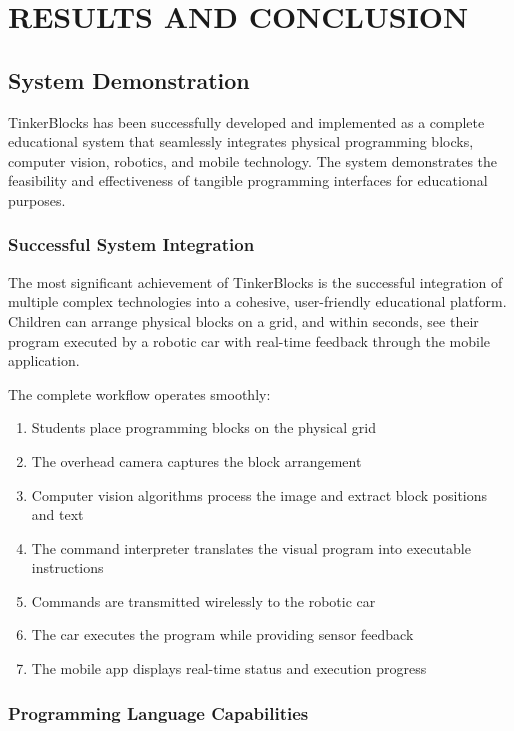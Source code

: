 \chapter{RESULTS AND CONCLUSION}

\section{System Demonstration}

TinkerBlocks has been successfully developed and implemented as a complete educational system that seamlessly integrates physical programming blocks, computer vision, robotics, and mobile technology. The system demonstrates the feasibility and effectiveness of tangible programming interfaces for educational purposes.

\subsection{Successful System Integration}

The most significant achievement of TinkerBlocks is the successful integration of multiple complex technologies into a cohesive, user-friendly educational platform. Children can arrange physical blocks on a grid, and within seconds, see their program executed by a robotic car with real-time feedback through the mobile application.

The complete workflow operates smoothly:
\begin{enumerate}
    \item Students place programming blocks on the physical grid
    \item The overhead camera captures the block arrangement
    \item Computer vision algorithms process the image and extract block positions and text
    \item The command interpreter translates the visual program into executable instructions
    \item Commands are transmitted wirelessly to the robotic car
    \item The car executes the program while providing sensor feedback
    \item The mobile app displays real-time status and execution progress
\end{enumerate}

\subsection{Programming Language Capabilities}

